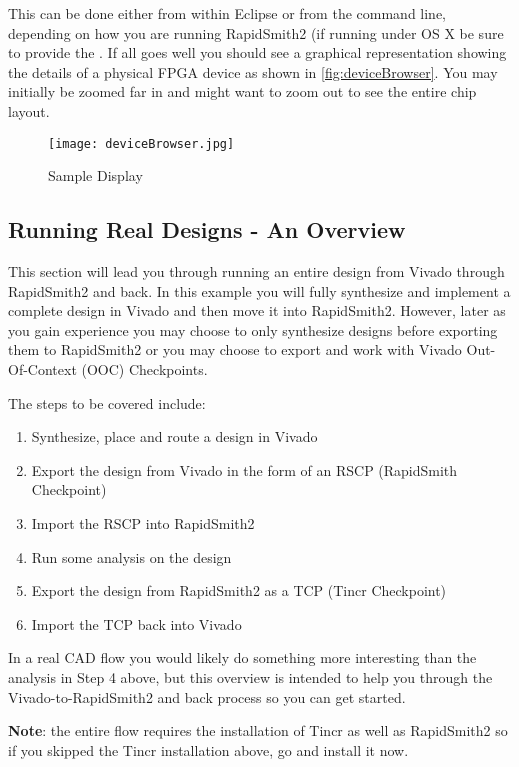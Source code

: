 \noindent This can be done either from within Eclipse or from the command line,
depending on how you are running RapidSmith2 (if running under OS X be sure to provide the
. If all goes well you should see a
graphical representation showing the details of a physical FPGA device as shown
in \autoref{fig:deviceBrowser}.  You may initially be zoomed far in and might
want to zoom out to see the entire chip layout.

\begin{figure}[H]
\centering
\texttt{[image: deviceBrowser.jpg]}
\caption{ Sample Display}
\label{fig:deviceBrowser}
\end{figure}

\subsection{Running Real Designs - An Overview}
This section will lead you through running an entire design from Vivado through
RapidSmith2 and back.  In this example you will fully synthesize and implement a
complete design in Vivado and then move it into RapidSmith2.  However, later as you gain
experience you may choose to only synthesize  designs before exporting
them to RapidSmith2 or you may choose to export and work with Vivado Out-Of-Context
(OOC) Checkpoints.

The steps to be covered include:

\begin{enumerate}
  \item Synthesize, place and route a design in Vivado
  \item  Export the design from Vivado in the form of an RSCP (RapidSmith
  Checkpoint)
  \item Import the RSCP  into RapidSmith2
  \item Run some analysis on the design
  \item Export the design from RapidSmith2 as a TCP (Tincr Checkpoint)
  \item Import the TCP back into Vivado
\end{enumerate}

In a real CAD flow you would likely do something more interesting
than the analysis in Step 4 above, but this overview is intended to help you
through the Vivado-to-RapidSmith2 and back process so you can get started.

\textbf{Note}: the entire flow requires the installation of Tincr as well as
RapidSmith2 so if you skipped the Tincr installation above, go and install it now.


